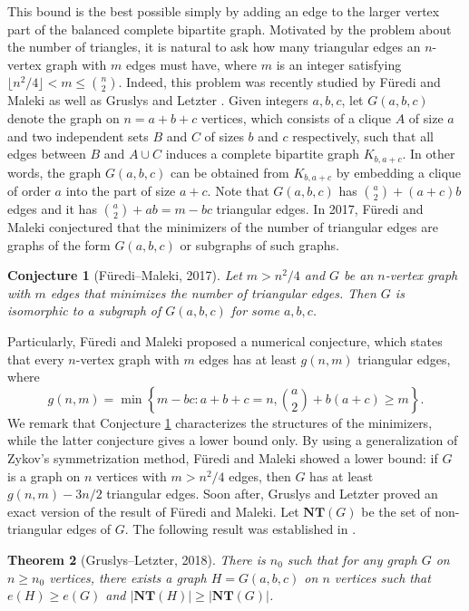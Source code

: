 \documentclass[11pt]{article}
\newtheorem{theorem}{Theorem}[section]
\newtheorem{conjecture}[theorem]{Conjecture}
\begin{document}
 This bound is the best possible simply by adding an edge to the larger vertex part of 
 the balanced  complete bipartite graph.  
Motivated by the problem about the number of triangles, 
it is natural to ask how many triangular edges an $n$-vertex 
graph with $m$ edges must have, where 
$m$ is an integer satisfying $\lfloor n^2/4\rfloor < m \le {n \choose 2}$. 
Indeed, this problem was recently studied by 
F\"{u}redi and Maleki \cite{FM2017} 
as well as Gruslys and Letzter \cite{GL2018}. 
Given integers $a,b,c$, let 
$G(a,b,c)$ denote the graph on 
$n=a+b+c$ vertices, which consists of a clique $A$ 
of size $a$ and two independent sets $B$ and $C$ 
of sizes $b$ and $c$ respectively, such that 
all edges between $B$ and $A\cup C$ induces a complete bipartite graph $K_{b,a+c}$. 
In other words, the graph $G(a,b,c)$ can be obtained from 
$K_{b,a+c}$ by embedding a clique of order $a$ into the part of size $a+c$. 
Note that $G(a,b,c)$ has ${a \choose 2} + (a+c)b$ edges and 
it has ${a \choose 2}+ab = m-bc$ triangular edges. 
In 2017, F\"{u}redi and Maleki \cite{FM2017}  
conjectured that the minimizers of the number of triangular
edges are graphs of the form $G(a,b,c)$ or 
subgraphs of such graphs. 

\begin{conjecture}[F\"{u}redi--Maleki, 2017] 
\label{conj-FM}
Let $m>  n^2/4 $ and $G$ be an $n$-vertex graph with $m$ edges that minimizes the number of triangular edges. 
Then $G$ is isomorphic to a subgraph of $G(a,b,c)$ 
for some $a,b,c$. 
\end{conjecture}


Particularly, F\"{u}redi and Maleki \cite{FM2017}  
proposed a numerical conjecture, which states that 
every $n$-vertex graph with $m$ edges has at least 
$g(n,m)$ triangular edges, where 
\[ g(n,m) = \min
\left\{m -bc: a+b+c =n, {a \choose 2} + b(a+c) \ge m \right\}. \]
We remark that Conjecture \ref{conj-FM} 
characterizes the structures of the minimizers, 
while the latter conjecture gives a lower bound only. 
By using a generalization of Zykov's symmetrization 
method, 
F\"{u}redi and Maleki \cite{FM2017} 
showed a lower bound: 
if $G$ is a graph on $n$ vertices with $m > n^2/4$ edges, 
then $G$ has at least 
$ g(n,m) - 3n/2 $ 
 triangular edges.  
Soon after, Gruslys and Letzter \cite{GL2018} 
proved an exact version of the result of F\"{u}redi and Maleki. 
Let $\mathbf{NT}(G)$ be the set of non-triangular edges of $G$. 
The following result was established in \cite{GL2018}. 

\begin{theorem}[Gruslys--Letzter, 2018] 
\label{thm-GL}
There is $n_0$ such that 
for any graph $G$ on  $n\ge n_0$ vertices, there exists 
a graph $H=G(a,b,c)$ on $n$ vertices such that $e(H)\ge e(G)$  and $|\mathbf{NT}(H)| \ge |\mathbf{NT}(G)|$. 
\end{theorem}
\end{document}
